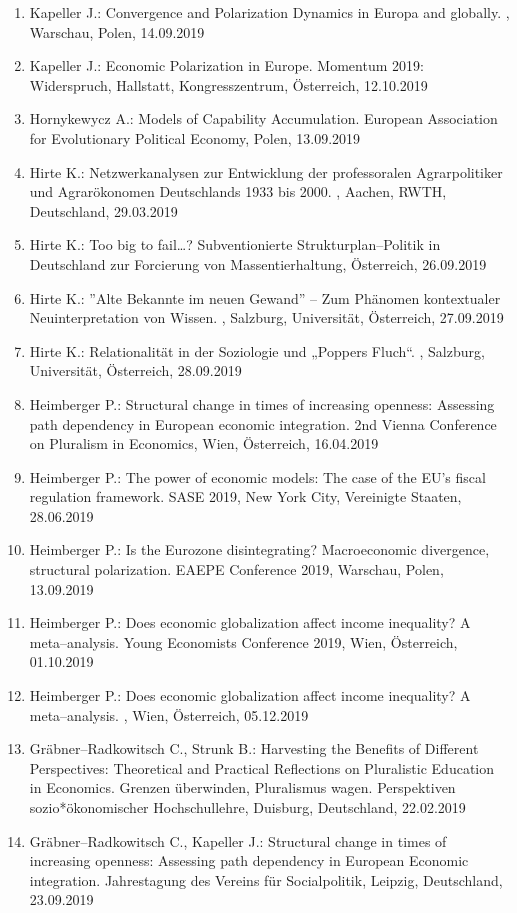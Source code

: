\begin{enumerate}
	\item Kapeller J.: Convergence and Polarization Dynamics in Europa and globally. , Warschau, Polen, 14.09.2019
	\item Kapeller J.: Economic Polarization in Europe. Momentum 2019: Widerspruch, Hallstatt, Kongresszentrum, Österreich, 12.10.2019
	\item Hornykewycz A.: Models of Capability Accumulation. European Association for Evolutionary Political Economy, Polen, 13.09.2019
	\item Hirte K.: Netzwerkanalysen zur Entwicklung der professoralen Agrarpolitiker und Agrarökonomen Deutschlands 1933 bis 2000. , Aachen, RWTH, Deutschland, 29.03.2019
	\item Hirte K.: Too big to fail…? Subventionierte Strukturplan--Politik in Deutschland zur Forcierung von Massentierhaltung, Österreich, 26.09.2019
	\item Hirte K.: ''Alte Bekannte im neuen Gewand'' – Zum Phänomen kontextualer Neuinterpretation von Wissen. , Salzburg, Universität, Österreich, 27.09.2019
	\item Hirte K.: Relationalität in der Soziologie und „Poppers Fluch“. , Salzburg, Universität, Österreich, 28.09.2019
	\item Heimberger P.: Structural change in times of increasing openness: Assessing path dependency in European economic integration. 2nd Vienna Conference on Pluralism in Economics, Wien, Österreich, 16.04.2019
	\item Heimberger P.: The power of economic models: The case of the EU's fiscal regulation framework. SASE 2019, New York City, Vereinigte Staaten, 28.06.2019
	\item Heimberger P.: Is the Eurozone disintegrating? Macroeconomic divergence, structural polarization. EAEPE Conference 2019, Warschau, Polen, 13.09.2019
	\item Heimberger P.: Does economic globalization affect income inequality? A meta--analysis. Young Economists Conference 2019, Wien, Österreich, 01.10.2019
	\item Heimberger P.: Does economic globalization affect income inequality? A meta--analysis. , Wien, Österreich, 05.12.2019
	\item Gräbner--Radkowitsch C., Strunk B.: Harvesting the Benefits of Different Perspectives: Theoretical and Practical Reflections on Pluralistic Education in Economics. Grenzen überwinden, Pluralismus wagen. Perspektiven sozio*ökonomischer Hochschullehre, Duisburg, Deutschland, 22.02.2019
	\item Gräbner--Radkowitsch C., Kapeller J.: Structural change in times of increasing openness: Assessing path dependency in European Economic integration. Jahrestagung des Vereins für Socialpolitik, Leipzig, Deutschland, 23.09.2019

\end{enumerate}

